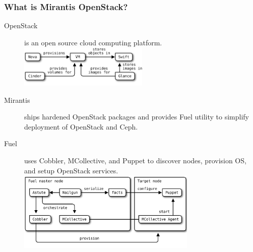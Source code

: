 \documentclass[hyperref=unicode,utf8,xcolor=pst]{beamer}
\begin{document}
\begin{frame}
	\frametitle{What is Mirantis OpenStack?}
	\begin{description}
		\item[OpenStack] is an open source cloud computing
			platform.\\
			\vspace{0.5ex}
			\includegraphics[height=2cm]{openstack-components}
		\item[Mirantis] ships hardened OpenStack packages and
			provides Fuel utility to simplify deployment of
			OpenStack and Ceph.
		\item[Fuel] uses Cobbler, MCollective, and Puppet to
			discover nodes, provision OS, and setup
			OpenStack services.\\
			\vspace{0.5ex}
			\includegraphics[height=3.8cm]{fuel-components}
	\end{description}
\end{frame}
\end{document}
